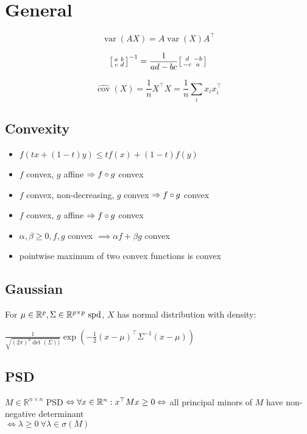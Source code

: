 \section*{General}

$$
\operatorname{var}(AX)=A\operatorname{var}(X)A^\top
$$

$$
\begin{bsmallmatrix}
a&b \\ 
c&d
\end{bsmallmatrix}^{-1}=\frac{1}{ad-bc}
\begin{bsmallmatrix}
d&-b \\ 
-c&a
\end{bsmallmatrix}
$$

$$
\widehat{\operatorname{cov}}(X)=\frac{1}{n}X^\top X=\frac{1}{n}\sum_i x_ix_i^\top
$$

\subsection*{Convexity}
\begin{itemize}
    \item{$f(t x + (1-t)y) \leq t f(x) + (1-t) f(y)$}
    \item{$f$ convex, $g$ affine $\Rightarrow f\circ g$ convex}
    \item{$f$ convex, non-decreasing, $g$ convex $\Rightarrow f\circ g$ convex}
    \item{$f$ convex, $g$ affine $\Rightarrow f\circ g$ convex}
    \item{$\alpha, \beta \geq 0, f, g$ convex $\implies \alpha f + \beta g$ convex}
    \item pointwise maximum of two convex functions is convex
\end{itemize}

\subsection*{Gaussian}

For $\mu \in \mathbb{R}^p, \Sigma \in \mathbb{R}^{p \times p} \ \text{spd}$, $X$ has normal distribution with density:

$\frac{1}{\sqrt{(2\pi)^p \det(\Sigma))}}\exp({-\frac{1}{2}(x-\mu)^\top \Sigma^{-1}(x-\mu)})$

\subsection*{PSD}
$M \in \mathbb{R}^{n\times n}$ PSD $\Leftrightarrow \forall x \in \mathbb{R}^n: x^\top Mx \geq 0 \\
\Leftrightarrow$ all principal minors of $M$ have non-negative determinant\\
$\Leftrightarrow \lambda \geq 0 \ \forall \lambda\in\sigma(M)$

